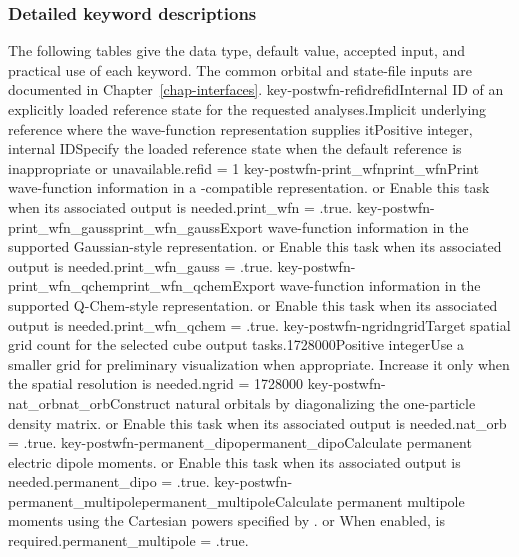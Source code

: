 \subsubsection*{Detailed keyword descriptions}
The following tables give the data type, default value, accepted input, and practical use of each keyword. The common orbital and state-file inputs are documented in Chapter~\ref{chap-interfaces}.
\keyword
{key-postwfn-refid}{refid}{Internal ID of an explicitly loaded reference state for the requested analyses.}{\OpOptional}{\OpInt}{Implicit underlying reference where the wave-function representation supplies it}{Positive integer, internal ID}{Specify the loaded reference state when the default reference is inappropriate or unavailable.}{refid = 1}
\keyword
{key-postwfn-print_wfn}{print\_wfn}{Print wave-function information in a \progname{}-compatible representation.}{\OpOptional}{\OpLogic}{\OpFalse}{\OpTrue{} or \OpFalse}{Enable this task when its associated output is needed.}{print\_wfn = .true.}
\keyword
{key-postwfn-print_wfn_gauss}{print\_wfn\_gauss}{Export wave-function information in the supported Gaussian-style representation.}{\OpOptional}{\OpLogic}{\OpFalse}{\OpTrue{} or \OpFalse}{Enable this task when its associated output is needed.}{print\_wfn\_gauss = .true.}
\keyword
{key-postwfn-print_wfn_qchem}{print\_wfn\_qchem}{Export wave-function information in the supported Q-Chem-style representation.}{\OpOptional}{\OpLogic}{\OpFalse}{\OpTrue{} or \OpFalse}{Enable this task when its associated output is needed.}{print\_wfn\_qchem = .true.}
\keyword
{key-postwfn-ngrid}{ngrid}{Target spatial grid count for the selected cube output tasks.}{\OpOptional}{\OpInt}{1728000}{Positive integer}{Use a smaller grid for preliminary visualization when appropriate. Increase it only when the spatial resolution is needed.}{ngrid = 1728000}
\keyword
{key-postwfn-nat_orb}{nat\_orb}{Construct natural orbitals by diagonalizing the one-particle density matrix.}{\OpOptional}{\OpLogic}{\OpFalse}{\OpTrue{} or \OpFalse}{Enable this task when its associated output is needed.}{nat\_orb = .true.}
\keyword
{key-postwfn-permanent_dipo}{permanent\_dipo}{Calculate permanent electric dipole moments.}{\OpOptional}{\OpLogic}{\OpFalse}{\OpTrue{} or \OpFalse}{Enable this task when its associated output is needed.}{permanent\_dipo = .true.}
\keyword
{key-postwfn-permanent_multipole}{permanent\_multipole}{Calculate permanent multipole moments using the Cartesian powers specified by .}{\OpOptional}{\OpLogic}{\OpFalse}{\OpTrue{} or \OpFalse}{When enabled,  is required.}{permanent\_multipole = .true.}
